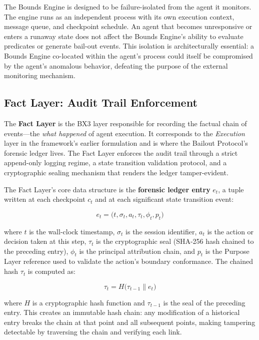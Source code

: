 The Bounds Engine is designed to be failure-isolated from the agent it monitors. The engine runs as an independent process with its own execution context, message queue, and checkpoint schedule. An agent that becomes unresponsive or enters a runaway state does not affect the Bounds Engine's ability to evaluate predicates or generate bail-out events. This isolation is architecturally essential: a Bounds Engine co-located within the agent's process could itself be compromised by the agent's anomalous behavior, defeating the purpose of the external monitoring mechanism.

\subsection{Fact Layer: Audit Trail Enforcement}
\label{sec:fact-layer}

The \textbf{Fact Layer} is the BX3 layer responsible for recording the factual chain of events—the \emph{what happened} of agent execution. It corresponds to the \emph{Execution} layer in the framework's earlier formulation and is where the Bailout Protocol's forensic ledger lives. The Fact Layer enforces the audit trail through a strict append-only logging regime, a state transition validation protocol, and a cryptographic sealing mechanism that renders the ledger tamper-evident.

The Fact Layer's core data structure is the \textbf{forensic ledger entry} $e_t$, a tuple written at each checkpoint $c_t$ and at each significant state transition event:

\begin{equation}
e_t = \bigl(t, \sigma_t, a_t, \tau_t, \phi_t, p_t\bigr)
\end{equation}

where $t$ is the wall-clock timestamp, $\sigma_t$ is the session identifier, $a_t$ is the action or decision taken at this step, $\tau_t$ is the cryptographic seal (SHA-256 hash chained to the preceding entry), $\phi_t$ is the principal attribution chain, and $p_t$ is the Purpose Layer reference used to validate the action's boundary conformance. The chained hash $\tau_t$ is computed as:

\begin{equation}
\tau_t = H\bigl(\tau_{t-1} \parallel e_t\bigr)
\end{equation}

where $H$ is a cryptographic hash function and $\tau_{t-1}$ is the seal of the preceding entry. This creates an immutable hash chain: any modification of a historical entry breaks the chain at that point and all subsequent points, making tampering detectable by traversing the chain and verifying each link.

